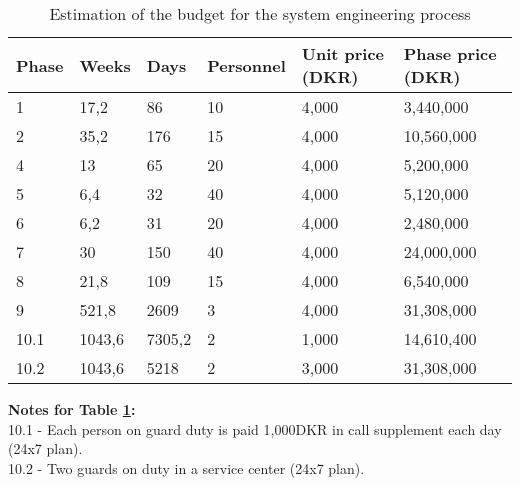 \begin{table}[H]
\centering
\begin{tabular}{|l|lllll|}
\hline
\textbf{Phase} & \multicolumn{1}{c}{\textbf{Weeks}} & \textbf{Days} & \textbf{Personnel} & \textbf{Unit price (DKR)} & \textbf{Phase price (DKR)} \\ \hline
1              & 17,2                               & 86            & 10                 & 4,000                     & 3,440,000                  \\
2              & 35,2                               & 176           & 15                 & 4,000                     & 10,560,000                 \\
4              & 13                                 & 65            & 20                 & 4,000                     & 5,200,000                  \\
5              & 6,4                                & 32            & 40                 & 4,000                     & 5,120,000                  \\
6              & 6,2                                & 31            & 20                 & 4,000                     & 2,480,000                  \\
7              & 30                                 & 150           & 40                 & 4,000                     & 24,000,000                 \\
8              & 21,8                               & 109           & 15                 & 4,000                     & 6,540,000                  \\
9              & 521,8                              & 2609          & 3                  & 4,000                     & 31,308,000                 \\
10.1           & 1043,6                             & 7305,2        & 2                  & 1,000                     & 14,610,400                 \\
10.2           & 1043,6                             & 5218          & 2                  & 3,000                     & 31,308,000                 \\ \hline
\end{tabular}
\caption{Estimation of the budget for the system engineering process}
\label{tab:BudgetEstimation}
\end{table}

\textbf{Notes for Table \ref{tab:BudgetEstimation}:} \\
10.1 - Each person on guard duty is paid 1,000DKR in call supplement each day (24x7 plan). \\
10.2 - Two guards on duty in a service center (24x7 plan).

